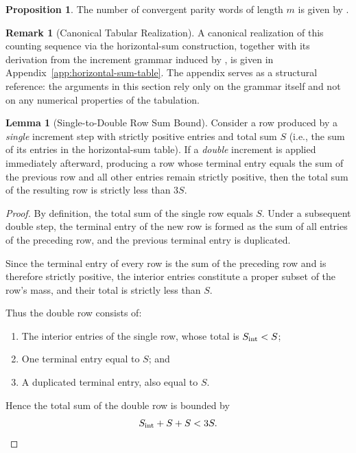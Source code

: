 \documentclass[12pt, oneside]{article}   	%
\numberwithin{equation}{section}          %
\theoremstyle{definition}
\newtheorem{proposition}{Proposition}[section]
\newtheorem{lemma}[theorem]{Lemma}
\newtheorem*{remark}{Remark}
\begin{document}
\begin{proposition}
The number of convergent parity words of length $m$ is given by .
\end{proposition}

\begin{remark}[Canonical Tabular Realization]
A canonical realization of this counting sequence via the horizontal-sum construction,
together with its derivation from the increment grammar induced by , is given
in Appendix~\ref{app:horizontal-sum-table}. The appendix serves as a structural reference:
the arguments in this section rely only on the grammar itself and not on any numerical
properties of the tabulation.
\end{remark}

\begin{lemma}[Single-to-Double Row Sum Bound]
\label{lem:single-double-bound}
Consider a row produced by a \emph{single} increment step with strictly positive entries 
and total sum $S$ (i.e., the sum of its entries in the horizontal-sum table). 
If a \emph{double} increment is applied immediately afterward, producing a row whose 
terminal entry equals the sum of the previous row and all other entries remain strictly positive, 
then the total sum of the resulting row is strictly less than $3S$.
\end{lemma}

\begin{proof}
By definition, the total sum of the single row equals $S$.  Under a subsequent double step,
the terminal entry of the new row is formed as the sum of all entries of the preceding row,
and the previous terminal entry is duplicated.

\newpage
Since the terminal entry of every row is the sum of the preceding row and is therefore 
strictly positive, the interior entries constitute a proper subset of the row’s mass, and
their total is strictly less than $S$.

Thus the double row consists of:
\begin{enumerate}
    \item The interior entries of the single row, whose total is $S_{\rm int} < S$;
    \item One terminal entry equal to $S$; and
    \item A duplicated terminal entry, also equal to $S$.
\end{enumerate}

Hence the total sum of the double row is bounded by
\[
S_{\rm int} + S + S < 3S.
\]
\end{proof}
\end{document}
